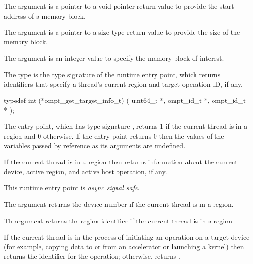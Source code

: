 \argdesc
The  argument is a pointer to a void pointer return value
to provide the start address of a memory block.  

The  argument is a pointer to a size type return
value to provide the size of the memory block.

The  argument is an integer value to specify the
memory block of interest.



\label{sec:ompt_get_target_info_t}
\label{sec:ompt_get_target_info}

\summary
The  type is the type signature of the 
 runtime entry point, which returns identifiers 
that specify a thread's current  region and target operation ID, if any.

\format
\begin{ccppspecific}
\begin{omptInquiry}
typedef int (*ompt_get_target_info_t) (
  uint64_t *,
  ompt_id_t *,
  ompt_id_t *
);
\end{omptInquiry}
\end{ccppspecific}

\descr
The  entry point, which has type signature 
, returns 1 if the current thread is in a 
 region and 0 otherwise. If the entry point returns 0 then
the values of the variables passed by reference as its arguments are undefined.

If the current thread is in a  region then 
returns information about the current device, active  region, and
active host operation, if any.

This runtime entry point is \emph{async signal safe}.

\argdesc
The  argument returns the device number if the current 
thread is in a  region.

Th  argument returns the  region identifier 
if the current thread is in a  region.

If the current thread is in the process of initiating an operation on a 
target device (for example, copying data to or from an accelerator or 
launching a kernel) then  returns the identifier for the 
operation; otherwise,  returns .


